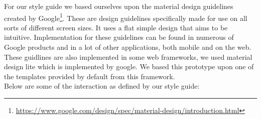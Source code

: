 For our style guide we based ourselves upon the material design guidelines created by Google\footnote{\url{https://www.google.com/design/spec/material-design/introduction.html}}. These are design guidelines specifically made for use on all sorts of different screen sizes. It uses a flat simple design that aims to be intuitive. Implementation for these guidelines can be found in numerous of Google products and in a lot of other applications, both mobile and on the web.\\
These guidlines are also implemented in some web frameworks, we used material design lite which is implemented by google. We based this prototype upon one of the templates provided by default from this framework.\\

Below are some of the interaction as defined by our style guide:\\
